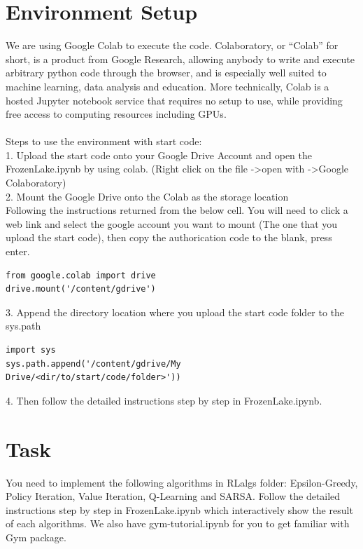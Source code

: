 \documentclass[letterpaper,12pt]{article}
\begin{document}
\section{Environment Setup}
We are using Google Colab \cite{colab} to execute the code. Colaboratory, or “Colab” for short, is a product from Google Research, allowing anybody to write and execute arbitrary python code through the browser, and is especially well suited to machine learning, data analysis and education. More technically, Colab is a hosted Jupyter notebook service that requires no setup to use, while providing free access to computing resources including GPUs. \\
\\
Steps to use the environment with start code: \\
1. Upload the start code onto your Google Drive Account and open the FrozenLake.ipynb by using colab. (Right click on the file -\textgreater open with -\textgreater Google Colaboratory) \\
2. Mount the Google Drive onto the Colab as the storage location \\
Following the instructions returned from the below cell. You will need to click a web link and select the google account you want to mount (The one that you upload the start code), then copy the authorication code to the blank, press enter.
\begin{verbatim}
from google.colab import drive
drive.mount('/content/gdrive')
\end{verbatim}
3. Append the directory location where you upload the start code folder to the sys.path 
\begin{verbatim}
import sys
sys.path.append('/content/gdrive/My Drive/<dir/to/start/code/folder>'))
\end{verbatim}
4. Then follow the detailed instructions step by step in FrozenLake.ipynb.



\section{Task} \label{sec:task}
You need to implement the following algorithms in RLalgs folder: Epsilon-Greedy, Policy Iteration, Value Iteration, Q-Learning and SARSA. Follow the detailed instructions step
by step in FrozenLake.ipynb which interactively show the result of each algorithms. We also have gym-tutorial.ipynb for you to get familiar with Gym package.
\end{document}
